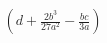 \documentclass[preview]{standalone}
\begin{document}
\begin{align*}
\left( d + \frac{2b^3}{27a^2}-\frac{bc}{3a} \right)
\end{align*}
\end{document}
